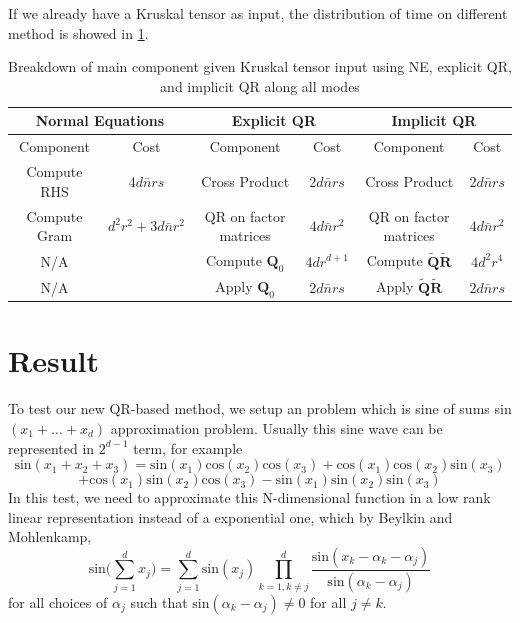 \documentclass{article}
\newcommand{\mat}[1]{\mathbf{#1}}
\begin{document}
If we already have a Kruskal tensor as input, the distribution of time on different method is showed in \cref{tab:kruskal_its_part}.
\begin{table}[!ht] 
  \centering
  \begin{tabular}{|c|c|c|c|c|c|}
    \hline
    \multicolumn{2}{|c|}{\textbf{Normal Equations}} & \multicolumn{2}{|c|}{\textbf{Explicit QR}} & \multicolumn{2}{|c|}{\textbf{Implicit QR}} \\
    \hline
    Component & Cost & Component & Cost & Component & Cost \\
    \hline
    Compute RHS &$4d\bar n rs$ &  Cross Product&$2d\bar n rs$  & Cross Product &$2d\bar n rs$  \\
    Compute Gram & $d^2r^2+3d\bar n r^2$&QR on factor matrices & $4d \bar n r^2$ & QR on factor matrices & $4d \bar n r^2$\\
    N/A& &Compute $\mat{Q}_0$ & $4dr^{d+1}$& Compute $\tilde{\mat{Q}}\tilde{\mat{R}}$& $4d^2r^4$\\
    N/A & &Apply $\mat{Q}_0$& $2d\bar nrs$& Apply $\tilde{\mat{Q}}\tilde{\mat{R}}$& $2d \bar n rs$\\
    \hline
  \end{tabular}
  \caption{Breakdown of main component given Kruskal tensor input using NE, explicit QR, and implicit QR along all modes}
  \label{tab:kruskal_its_part}
\end{table}


  




\section{Result}
To test our new QR-based method, we setup an problem which is sine of sums sin$(x_1+\dots+ x_d)$ approximation problem.
Usually this sine wave can be represented in $2^{d-1}$ term, for example
$$\text{sin}(x_1+x_2+x_3) = \text{sin}(x_1)\text{cos}(x_2)\text{cos}(x_3)+\text{cos}(x_1)\text{cos}(x_2)\text{sin}(x_3)$$
$$+\text{cos}(x_1)\text{sin}(x_2)\text{cos}(x_3) - \text{sin}(x_1)\text{sin}(x_2)\text{sin}(x_3)$$
In this test, we need to approximate this N-dimensional function in a low rank linear representation instead of a exponential one, which by Beylkin and Mohlenkamp,
$$\text{sin}\bigl(\sum^d_{j=1}x_j\bigr) = \sum^d_{j=1}\text{sin}(x_j)\prod^d_{k=1,k\neq j}\frac{\text{sin}(x_k - \alpha_k -\alpha_j)}{\text{sin}(\alpha_k - \alpha_j)}$$
for all choices of  ${\alpha_j}$ such that $\text{sin}(\alpha_k - \alpha_j) \neq 0$ for all $j \neq k$.
\end{document}
